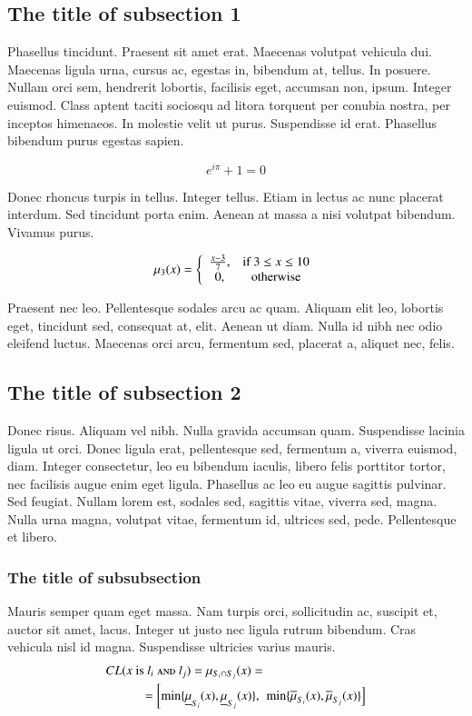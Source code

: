 \documentclass{jacsart}
\begin{document}
\subsection{The title of subsection 1}
Phasellus tincidunt.
Praesent sit amet erat. Maecenas volutpat vehicula dui. Maecenas ligula urna,
cursus ac, egestas in, bibendum at, tellus. In posuere. Nullam orci sem,
hendrerit lobortis, facilisis eget, accumsan non, ipsum. Integer euismod.
Class aptent taciti sociosqu ad litora torquent per conubia nostra, per
inceptos himenaeos. In molestie velit ut purus. Suspendisse id erat. Phasellus
bibendum purus egestas sapien. 

\begin{equation} \label{label-of-equation-1}
  e^{i \pi} + 1 = 0
\end{equation}

Donec rhoncus turpis in tellus. Integer tellus. Etiam in lectus ac nunc
placerat interdum. Sed tincidunt porta enim. Aenean at massa a nisi volutpat
bibendum. Vivamus purus. 

\begin{eqnarray}
\mu_3(x) = \left\{ 
\begin{array}{cc}
      {x-3 \over 7}, & \mbox{if $3 \leq x \leq 10$} \\
      0, & \mbox{otherwise}
\end{array}
\right.
\end{eqnarray}

Praesent nec leo. Pellentesque sodales arcu ac quam.
Aliquam elit leo, lobortis eget, tincidunt sed, consequat at, elit. Aenean ut
diam. Nulla id nibh nec odio eleifend luctus. Maecenas orci arcu, fermentum
sed, placerat a, aliquet nec, felis.

\subsection{The title of subsection 2}
Donec risus. Aliquam vel nibh. Nulla gravida accumsan quam. Suspendisse
lacinia ligula ut orci. Donec ligula erat, pellentesque sed, fermentum a,
viverra euismod, diam. Integer consectetur, leo eu bibendum iaculis, libero
felis porttitor tortor, nec facilisis augue enim eget ligula. Phasellus ac leo
eu augue sagittis pulvinar. Sed feugiat. Nullam lorem est, sodales sed,
sagittis vitae, viverra sed, magna. Nulla urna magna, volutpat vitae,
fermentum id, ultrices sed, pede. Pellentesque et libero.

\subsubsection{The title of subsubsection} 
Mauris semper quam
eget massa. Nam turpis orci, sollicitudin ac, suscipit et, auctor sit amet,
lacus. Integer ut justo nec ligula rutrum bibendum. Cras vehicula nisl id
magna. Suspendisse ultricies varius mauris.
\begin{eqnarray}
CL(\mbox{$x$ is $l_i$ {\sc and} $l_j$}) = \mu_{S_i \cap
S_j}(x) = & \nonumber \\
= \left[\min\{\underline\mu_{S_i}(x), \underline\mu_{S_j}(x)\},\right. & \left. \min\{\overline\mu_{S_i}(x), \overline\mu_{S_j}(x)\}\right] 
\end{eqnarray}
\end{document}
